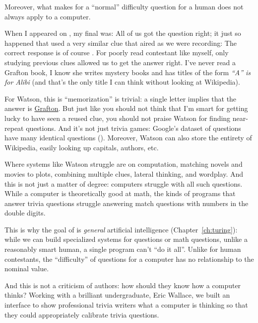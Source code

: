 Moreover, what makes for a ``normal'' difficulty question for a human
does not always apply to a computer.
%


When I appeared on \jeopardyp{}, my final \jeopardy{} was:
%
%
All of us got the question right; it just so happened that \jeopardy{}
used a very similar clue that aired as we were recording:
%
%
The correct response is of course .
%
For poorly read contestant like myself, only studying previous clues
allowed us to get the answer right.
%
I've never read a Grafton book, I know she writes mystery books and
has titles of the form \textit{``A'' is for Alibi} (and that's the
only title I can think without looking at Wikipedia).

For Watson, this is ``memorization'' is trivial: a single letter
implies that the answer is \underline{Grafton}.
%
But just like you should not think that I'm smart for getting lucky to
have seen a reused clue, you should not praise Watson for finding
near-repeat questions.
%
And it's not just trivia games: Google's dataset of questions have
many identical questions ().
%
Moreover, Watson can also store the entirety of Wikipedia, easily
looking up capitals, authors, etc.

Where systems like Watson struggle are on computation, matching novels
and movies to plots, combining multiple clues, lateral thinking, and
wordplay.
%
And this is not just a matter of degree: computers struggle with all
such questions.
%
While a computer is theoretically good at math, the kinds of programs
that answer trivia questions struggle answering match questions with
numbers in the double digits.

This is why the goal of  is \emph{general} artificial
intelligence (Chapter~\ref{ch:turing}): while we can build specialized
systems for \jeopardy{} questions or math questions, unlike a
reasonably smart human, a single program can't ``do it all''.
%
Unlike for human contestants, the ``difficulty'' of \jeopardy{}
questions for a computer has no relationship to the nominal value.

And this is not a criticism of \jeopardy{} authors: how should they
know how a computer thinks?
%
Working with a brilliant undergraduate, Eric Wallace, we built an
interface to show professional trivia writers what a computer is
thinking so that they could appropriately calibrate trivia questions.

